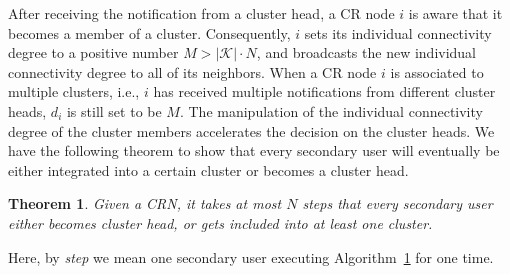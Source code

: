 \documentclass[times]{ettauth}
\newcommand{\ie}{i.e., }
\theoremstyle{mytheoremstyle}
\newtheorem{theorem}{Theorem}[section]
\theoremstyle{mytheoremstyle}
\theoremstyle{mytheoremstyle}
\begin{document}
After receiving the notification from a cluster head, a CR node $i$ is aware that it becomes a member of a cluster. 
Consequently, $i$ sets its individual connectivity degree to a positive number $M > |\mathcal{K}| \cdot N$, and broadcasts the new individual connectivity degree to all of its neighbors. 
When a CR node $i$ is associated to multiple clusters, \ie $i$ has received multiple notifications from different cluster heads, $d_i$ is still set to be $M$. 
The manipulation of the individual connectivity degree of the cluster members accelerates the decision on the cluster heads.
We have the following theorem to show that every secondary user will eventually be either integrated into a certain cluster or becomes a cluster head.
\begin{theorem}
\label{clustering:theorem}
Given a CRN, it takes at most $N$ steps that every secondary user either becomes cluster head, or gets included into at least one cluster.
\end{theorem}
Here, by \textit{step} we mean one secondary user executing Algorithm~\ref{clustering:theorem} for one time.
\end{document}
